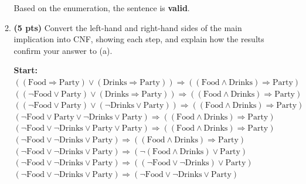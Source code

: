 \documentclass{article}
\begin{document}
\begin{enumerate}
\begin{enumerate}[label=($\alph*$)]
        Based on the enumeration, the sentence is \textbf{valid}.
    \color{black}



    \item \textbf{(5 pts)} Convert the left-hand and right-hand sides of the main implication into CNF, showing each step, and explain how the results confirm your answer to (a).

    \color{blue}
        \textbf{Start:} $((\text{Food} \Rightarrow \text{Party}) \vee (\text{Drinks} \Rightarrow \text{Party})) \Rightarrow ((\text{Food} \wedge \text{Drinks}) \Rightarrow \text{Party})$\\
        $((\neg \text{Food} \vee \text{Party}) \vee (\text{Drinks} \Rightarrow \text{Party})) \Rightarrow ((\text{Food} \wedge \text{Drinks}) \Rightarrow \text{Party})$ \\
        $((\neg \text{Food} \vee \text{Party}) \vee (\neg \text{Drinks} \vee \text{Party})) \Rightarrow ((\text{Food} \wedge \text{Drinks}) \Rightarrow \text{Party})$  \\
        $(\neg \text{Food} \vee \text{Party} \vee \neg \text{Drinks} \vee \text{Party}) \Rightarrow ((\text{Food} \wedge \text{Drinks}) \Rightarrow \text{Party})$  \\
        $(\neg \text{Food} \vee \neg \text{Drinks} \vee \text{Party} \vee \text{Party}) \Rightarrow ((\text{Food} \wedge \text{Drinks}) \Rightarrow \text{Party})$  \\
        $(\neg \text{Food} \vee \neg \text{Drinks} \vee \text{Party}) \Rightarrow ((\text{Food} \wedge \text{Drinks}) \Rightarrow \text{Party})$  \\
        $(\neg \text{Food} \vee \neg \text{Drinks} \vee \text{Party}) \Rightarrow (\neg (\text{Food} \wedge \text{Drinks}) \vee \text{Party})$  \\
        $(\neg \text{Food} \vee \neg \text{Drinks} \vee \text{Party}) \Rightarrow ((\neg \text{Food} \vee \neg \text{Drinks}) \vee \text{Party})$  \quad [De Morgan]\\
        $(\neg \text{Food} \vee \neg \text{Drinks} \vee \text{Party}) \Rightarrow (\neg \text{Food} \vee \neg \text{Drinks} \vee \text{Party})$  \\
        

\end{enumerate}
\end{enumerate}
\end{document}
